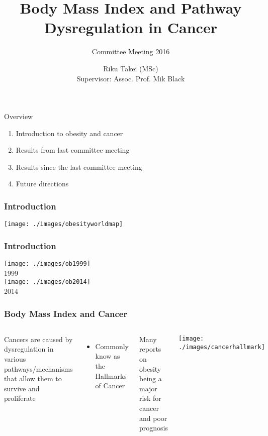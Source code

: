 \documentclass[handout]{beamer}
\title[BMI and Cancer Pathway]{Body Mass Index and Pathway Dysregulation in Cancer}
\subtitle{Committee Meeting 2016}
\author[Riku Takei]{Riku Takei (MSc)\\Supervisor: Assoc. Prof. Mik Black}
\institute{Department of Biochemistry, University of Otago}
\begin{document}
{
	\begin{frame}[noframenumbering]
		\titlepage
	\end{frame}
}

\begin{frame}{Overview}
	\begin{enumerate}
		\item Introduction to obesity and cancer
		\item Results from last committee meeting
		\item Results since the last committee meeting
		\item Future directions
	\end{enumerate}
\end{frame}

\begin{frame}
	\frametitle{Introduction}
	\begin{center}
		\texttt{[image: ./images/obesityworldmap]}
	\end{center}
\end{frame}

\begin{frame}
	\frametitle{Introduction}
	\begin{center}
		\texttt{[image: ./images/ob1999]}\\
		1999\\
		\texttt{[image: ./images/ob2014]}\\
		2014
	\end{center}
\end{frame}

\begin{frame}
	\frametitle{Body Mass Index and Cancer}
	\begin{columns}
		{\footnotesize
			Cancers are caused by dysregulation in various pathways/mechanisms that allow them to survive and proliferate
			\begin{itemize}
				\item Commonly know as the Hallmarks of Cancer \citep{Hanahan2011}
			\end{itemize}
			Many reports on obesity being a major risk for cancer and poor prognosis
		}
		\texttt{[image: ./images/cancerhallmark]}
	\end{columns}
\end{frame}
\end{document}
